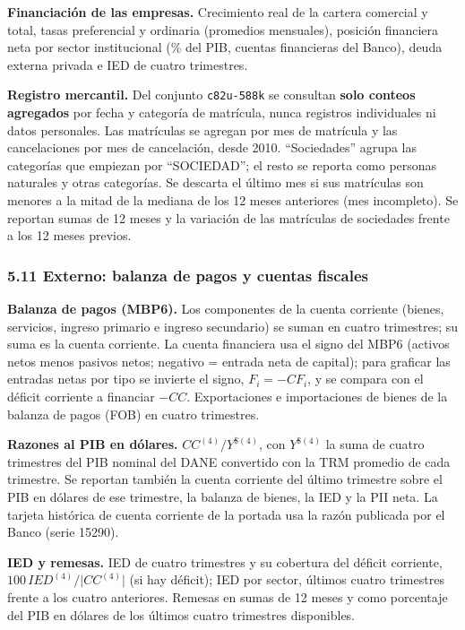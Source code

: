 \textbf{Financiación de las empresas.} Crecimiento real de la cartera
comercial y total, tasas preferencial y ordinaria (promedios mensuales),
posición financiera neta por sector institucional (\% del PIB, cuentas
financieras del Banco), deuda externa privada e IED de cuatro
trimestres.

\textbf{Registro mercantil.} Del conjunto \texttt{c82u-588k} se
consultan \textbf{solo conteos agregados} por fecha y categoría de
matrícula, nunca registros individuales ni datos personales. Las
matrículas se agregan por mes de matrícula y las cancelaciones por mes
de cancelación, desde 2010. ``Sociedades'' agrupa las categorías que
empiezan por ``SOCIEDAD''; el resto se reporta como personas naturales y
otras categorías. Se descarta el último mes si sus matrículas son
menores a la mitad de la mediana de los 12 meses anteriores (mes
incompleto). Se reportan sumas de 12 meses y la variación de las
matrículas de sociedades frente a los 12 meses previos.

\hypertarget{externo-balanza-de-pagos-y-cuentas-fiscales}{%
\subsubsection{5.11 Externo: balanza de pagos y cuentas
fiscales}\label{externo-balanza-de-pagos-y-cuentas-fiscales}}

\textbf{Balanza de pagos (MBP6).} Los componentes de la cuenta corriente
(bienes, servicios, ingreso primario e ingreso secundario) se suman en
cuatro trimestres; su suma es la cuenta corriente. La cuenta financiera
usa el signo del MBP6 (activos netos menos pasivos netos; negativo =
entrada neta de capital); para graficar las entradas netas por tipo se
invierte el signo, \(F_i=-CF_i\), y se compara con el déficit corriente
a financiar \(-CC\). Exportaciones e importaciones de bienes de la
balanza de pagos (FOB) en cuatro trimestres.

\textbf{Razones al PIB en dólares.} \(CC^{(4)}/Y^{\$(4)}\), con
\(Y^{\$(4)}\) la suma de cuatro trimestres del PIB nominal del DANE
convertido con la TRM promedio de cada trimestre. Se reportan también la
cuenta corriente del último trimestre sobre el PIB en dólares de ese
trimestre, la balanza de bienes, la IED y la PII neta. La tarjeta
histórica de cuenta corriente de la portada usa la razón publicada por
el Banco (serie 15290).

\textbf{IED y remesas.} IED de cuatro trimestres y su cobertura del
déficit corriente, \(100\,IED^{(4)}/\lvert CC^{(4)}\rvert\) (si hay
déficit); IED por sector, últimos cuatro trimestres frente a los cuatro
anteriores. Remesas en sumas de 12 meses y como porcentaje del PIB en
dólares de los últimos cuatro trimestres disponibles.

